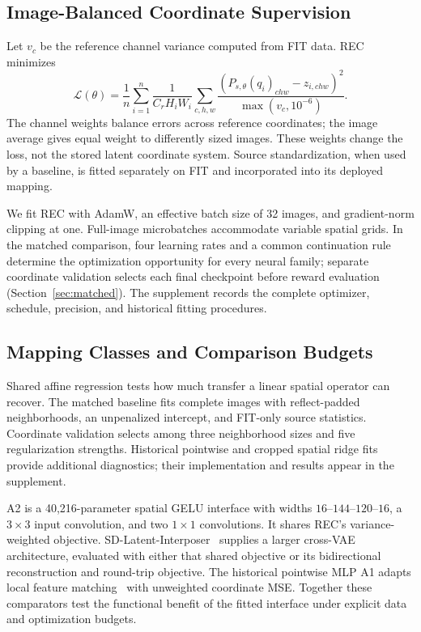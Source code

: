 \documentclass[10pt,twocolumn,letterpaper]{article}
\begin{document}
\subsection{Image-Balanced Coordinate Supervision}
Let $v_c$ be the reference channel variance computed from FIT data. REC minimizes
\begin{equation}
 \mathcal L(\theta)=\frac1n\sum_{i=1}^{n}\frac1{C_rH_iW_i}
 \sum_{c,h,w}\frac{(P_{s,\theta}(q_i)_{chw}-z_{i,chw})^2}{\max(v_c,10^{-6})}.
 \label{eq:loss}
\end{equation}
The channel weights balance errors across reference coordinates; the image average gives equal weight to differently sized images. These weights change the loss, not the stored latent coordinate system. Source standardization, when used by a baseline, is fitted separately on FIT and incorporated into its deployed mapping.

We fit REC with AdamW, an effective batch size of 32 images, and gradient-norm clipping at one. Full-image microbatches accommodate variable spatial grids. In the matched comparison, four learning rates and a common continuation rule determine the optimization opportunity for every neural family; separate coordinate validation selects each final checkpoint before reward evaluation (Section~\ref{sec:matched}). The supplement records the complete optimizer, schedule, precision, and historical fitting procedures.

\subsection{Mapping Classes and Comparison Budgets}
Shared affine regression tests how much transfer a linear spatial operator can recover. The matched baseline fits complete images with reflect-padded neighborhoods, an unpenalized intercept, and FIT-only source statistics. Coordinate validation selects among three neighborhood sizes and five regularization strengths. Historical pointwise and cropped spatial ridge fits provide additional diagnostics; their implementation and results appear in the supplement.

A2 is a 40,216-parameter spatial GELU interface with widths $16$--$144$--$120$--$16$, a $3\!\times\!3$ input convolution, and two $1\!\times\!1$ convolutions. It shares REC's variance-weighted objective. SD-Latent-Interposer~\cite{city96latentinterposer} supplies a larger cross-VAE architecture, evaluated with either that shared objective or its bidirectional reconstruction and round-trip objective. The historical pointwise MLP A1 adapts local feature matching~\cite{mai2026revisiting} with unweighted coordinate MSE. Together these comparators test the functional benefit of the fitted interface under explicit data and optimization budgets.
\end{document}
